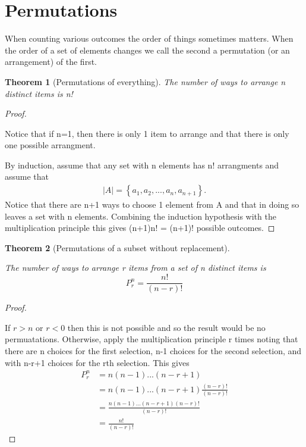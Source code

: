 \documentclass[10pt,]{book}
\theoremstyle{plain}
\newtheorem{theorem}{Theorem}[section]
\theoremstyle{definition}
\theoremstyle{definition}
\theoremstyle{definition}
\numberwithin{equation}{section}
\newcommand{\lt}{ < }
\newcommand{\gt}{ > }
\begin{document}
\section[{Permutations}]{Permutations}\label{section-14}
When counting various outcomes the order of things sometimes matters. When the order of a set of elements changes we call the second a permutation (or an arrangement) of the first.%
\begin{theorem}[{Permutations of everything}]\label{theorem-4}
The number of ways to arrange n distinct items is n!\end{theorem}
\begin{proof}\hypertarget{proof-4}{}
Notice that if n=1, then there is only 1 item to arrange and 
			that there is only one possible arrangment.%
\par

			By induction, assume that any set with n elements has n! arrangments 
			and assume that 
			\begin{gather*}
|A| = \left \{ a_1, a_2, ... , a_n, a_{n+1} \right \}.
\end{gather*}
			Notice that there are n+1 ways to choose 1 element from A and that in doing so leaves a set with n elements. Combining the induction hypothesis with the multiplication principle this gives (n+1)n! = (n+1)! possible outcomes.
\end{proof}
\begin{theorem}[{Permutations of a subset without replacement}]\label{theorem-5}
 
			The number of ways to arrange r items from a set of n distinct items 
			is 
			\begin{equation*} P_r^n = \frac{n!}{(n-r)!} \end{equation*}
\end{theorem}
\begin{proof}\hypertarget{proof-5}{}

			If \(r \gt n\) or \(r \lt 0 \) then this is not possible and so the result would be no permuatations. Otherwise, apply the multiplication principle r times noting that there are 
			n choices for the first selection, n-1 choices for the second
			selection, and with n-r+1 choices for the rth selection. This gives
			\begin{align*}
P_r^n & = n(n-1) ... (n-r+1)\\
& = n(n-1) ... (n-r+1)\frac{(n-r)!}{(n-r)!}\\
& = \frac{n(n-1) ... (n-r+1)(n-r)!}{(n-r)!}\\
& = \frac{n!}{(n-r)!}
\end{align*}
\end{proof}
\end{document}
